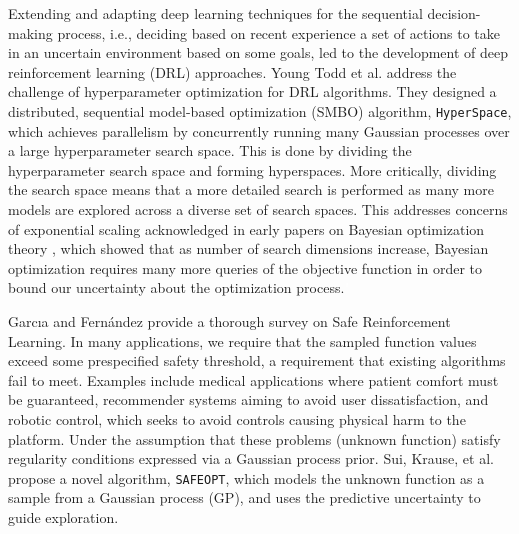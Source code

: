 Extending and adapting deep\textcolor{white}{"}learning techniques for the sequential decision-making process, i.e., deciding based on recent experience a set of actions to take in an uncertain environment based on some goals, led to the development of deep reinforcement learning (DRL) approaches. 
Young Todd et al. \cite{YoungHRK18} address the challenge of hyperparameter optimization for DRL algorithms. They designed a distributed, sequential model-based optimization (SMBO) algorithm, \texttt{HyperSpace}, which achieves parallelism by concurrently running many Gaussian processes over a large hyperparameter search space. 
This is done by dividing the hyperparameter search space and forming hyperspaces. 
More critically, dividing the search space means that a more detailed search is performed as many more models are explored across a diverse set of search spaces. 
This addresses concerns of exponential scaling acknowledged in early papers on Bayesian optimization theory \cite{pmlr-v9-grunewalder10a} \cite{Srinivas.2012}, which showed that as number of search dimensions increase, Bayesian optimization requires many more queries of the objective function in order to bound our uncertainty about the optimization process.\textcolor{white}{"}

Garcıa and Fernández \cite{garcia15a} provide a thorough survey on Safe Reinforcement Learning. 
In many applications, we require that the sampled function values exceed some prespecified safety threshold, a requirement that existing algorithms fail to meet. 
Examples include medical applications where patient comfort must be guaranteed, recommender systems aiming to avoid user dissatisfaction, and robotic control, which seeks to avoid controls causing physical harm to the platform. 
Under the assumption that these problems (unknown function) satisfy regularity conditions expressed via a Gaussian process prior. 
Sui, Krause, et al.\cite{SuiGBK15} propose a novel algorithm, \texttt{SAFEOPT}, which models the unknown function as a sample from a Gaussian process (GP), and uses the predictive uncertainty to guide exploration.

